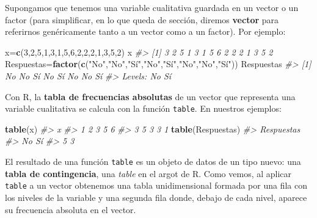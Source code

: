 \documentclass[
]{book}
\newenvironment{Shaded}{\begin{snugshade}}{\end{snugshade}}
\newcommand{\CommentTok}[1]{\textcolor[rgb]{0.56,0.35,0.01}{\textit{#1}}}
\newcommand{\DecValTok}[1]{\textcolor[rgb]{0.00,0.00,0.81}{#1}}
\newcommand{\KeywordTok}[1]{\textcolor[rgb]{0.13,0.29,0.53}{\textbf{#1}}}
\newcommand{\NormalTok}[1]{#1}
\newcommand{\StringTok}[1]{\textcolor[rgb]{0.31,0.60,0.02}{#1}}
\theoremstyle{definition}
\theoremstyle{definition}
\theoremstyle{definition}
\theoremstyle{remark}
\begin{document}
Supongamos que tenemos una variable cualitativa guardada en un vector o un factor (para simplificar, en lo que queda de sección, diremos \textbf{vector} para referirnos genéricamente tanto a un vector como a un factor). Por ejemplo:

\begin{Shaded}
\begin{Highlighting}[]
\NormalTok{x=}\KeywordTok{c}\NormalTok{(}\DecValTok{3}\NormalTok{,}\DecValTok{2}\NormalTok{,}\DecValTok{5}\NormalTok{,}\DecValTok{1}\NormalTok{,}\DecValTok{3}\NormalTok{,}\DecValTok{1}\NormalTok{,}\DecValTok{5}\NormalTok{,}\DecValTok{6}\NormalTok{,}\DecValTok{2}\NormalTok{,}\DecValTok{2}\NormalTok{,}\DecValTok{2}\NormalTok{,}\DecValTok{1}\NormalTok{,}\DecValTok{3}\NormalTok{,}\DecValTok{5}\NormalTok{,}\DecValTok{2}\NormalTok{)}
\NormalTok{x}
\CommentTok{\#\textgreater{}  [1] 3 2 5 1 3 1 5 6 2 2 2 1 3 5 2}
\NormalTok{Respuestas=}\KeywordTok{factor}\NormalTok{(}\KeywordTok{c}\NormalTok{(}\StringTok{"No"}\NormalTok{,}\StringTok{"No"}\NormalTok{,}\StringTok{"Sí"}\NormalTok{,}\StringTok{"No"}\NormalTok{,}\StringTok{"Sí"}\NormalTok{,}\StringTok{"No"}\NormalTok{,}\StringTok{"No"}\NormalTok{,}\StringTok{"Sí"}\NormalTok{))}
\NormalTok{Respuestas}
\CommentTok{\#\textgreater{} [1] No No Sí No Sí No No Sí}
\CommentTok{\#\textgreater{} Levels: No Sí}
\end{Highlighting}
\end{Shaded}

Con R, la \textbf{tabla de frecuencias absolutas} de un vector que representa una variable cualitativa se calcula con la función \texttt{table}. En nuestros ejemplos:

\begin{Shaded}
\begin{Highlighting}[]
\KeywordTok{table}\NormalTok{(x)}
\CommentTok{\#\textgreater{} x}
\CommentTok{\#\textgreater{} 1 2 3 5 6 }
\CommentTok{\#\textgreater{} 3 5 3 3 1}
\KeywordTok{table}\NormalTok{(Respuestas)}
\CommentTok{\#\textgreater{} Respuestas}
\CommentTok{\#\textgreater{} No Sí }
\CommentTok{\#\textgreater{}  5  3}
\end{Highlighting}
\end{Shaded}

El resultado de una función \texttt{table} es un objeto de datos de un tipo nuevo: una \textbf{tabla de contingencia}, una \emph{table} en el argot de R. Como vemos, al aplicar \texttt{table} a un vector obtenemos una tabla unidimensional formada por una fila con los niveles de la variable y una segunda fila donde, debajo de cada nivel, aparece su frecuencia absoluta en el vector.
\end{document}
